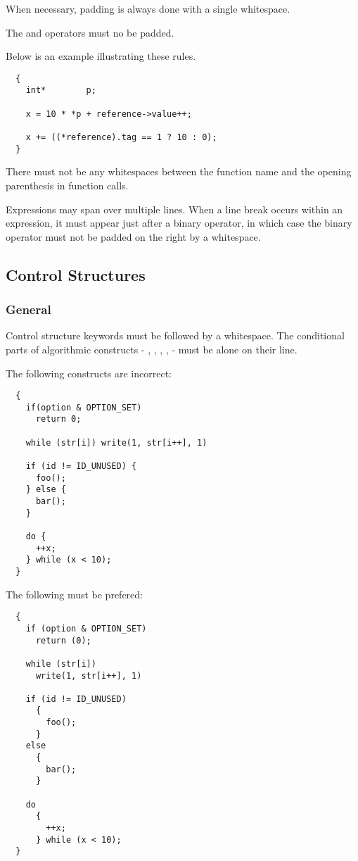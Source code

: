 When necessary, padding is always done with a single whitespace.

The  and \code{->} operators must no be padded.

Below is an example illustrating these rules.

\begin{verbatim}
  {
    int*        p;

    x = 10 * *p + reference->value++;

    x += ((*reference).tag == 1 ? 10 : 0);
  }
\end{verbatim}

There must not be any whitespaces between the function name and the opening
parenthesis in function calls.

Expressions may span over multiple lines. When a line break occurs within
an expression, it must appear just after a binary operator, in which case the
binary operator must not be padded on the right by a whitespace.

%
%

\subsection{Control Structures}


\subsubsection{General}

Control structure keywords must be followed by a whitespace. The conditional
parts of algorithmic constructs - , , ,
,  - must be alone on their line.

The following constructs are incorrect:

\begin{verbatim}
  {
    if(option & OPTION_SET)
      return 0;

    while (str[i]) write(1, str[i++], 1)

    if (id != ID_UNUSED) {
      foo();
    } else {
      bar();
    }

    do {
      ++x;
    } while (x < 10);
  }
\end{verbatim}

The following must be prefered:

\begin{verbatim}
  {
    if (option & OPTION_SET)
      return (0);

    while (str[i])
      write(1, str[i++], 1)

    if (id != ID_UNUSED)
      {
        foo();
      }
    else
      {
        bar();
      }

    do
      {
        ++x;
      } while (x < 10);
  }
\end{verbatim}


